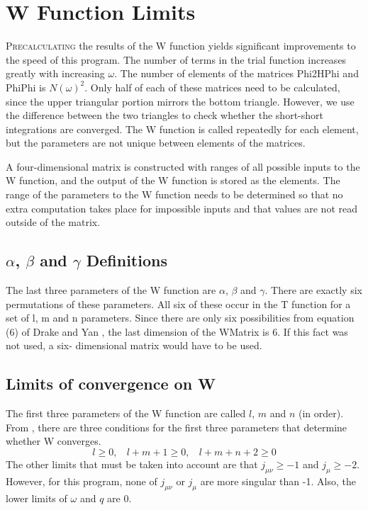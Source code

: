 \documentclass[Dissertation.tex]{subfiles}
\begin{document}
\chapter{W Function Limits}
\label{chp:WLimits}

\lettrine{\textcolor{startcolor}{P}}{recalculating} the results of the W 
function yields significant improvements to the speed of this program.  The 
number of terms in the trial function increases greatly with increasing
$\omega$. The number of elements of the matrices Phi2HPhi and PhiPhi is
$N(\omega)^2$. Only half of each of these matrices need to be calculated, 
since the upper triangular portion mirrors the bottom triangle. However, we 
use the difference between the two triangles to check whether the short-short 
integrations are converged. The W function is called repeatedly for each 
element, but the parameters are not unique between elements of the matrices.

A four-dimensional matrix is constructed with ranges of all possible inputs 
to the W function, and the output of the W function is stored as the 
elements.  The range of the parameters to the W function needs to be 
determined so that no extra computation takes place for impossible inputs and 
that values are not read outside of the matrix.

\section{\texorpdfstring{$\alpha$, $\beta$ and $\gamma$} {alpha, beta and gamma} Definitions}

The last three parameters of the W function are $\alpha$, $\beta$ and $\gamma$.
There are exactly six permutations of these parameters. All six of these 
occur in the T function for a set of l, m and n parameters. Since there are 
only six possibilities from equation (6) of Drake and Yan \cite{Drake1995}, 
the last dimension of the WMatrix is 6. If this fact was not used, a six-
dimensional matrix would have to be used.

\section{Limits of convergence on W}

The first three parameters of the W function are called $l$, $m$ and $n$
(in order). From \cite{Drake1995}, there are three conditions for the first
three parameters that determine whether W converges.
\[l \geq 0, ~~~~ l+m+1 \geq 0, ~~~~ l+m+n+2 \geq 0\]
The other limits that must be taken into account are that $j_{\mu \nu} \geq -1$
and $j_{\mu} \geq -2$. However, for this program, none of $j_{\mu \nu}$ or
$j_{\mu}$ are more singular than -1.  Also, the lower limits of $\omega$ and
$q$ are 0.
\end{document}
